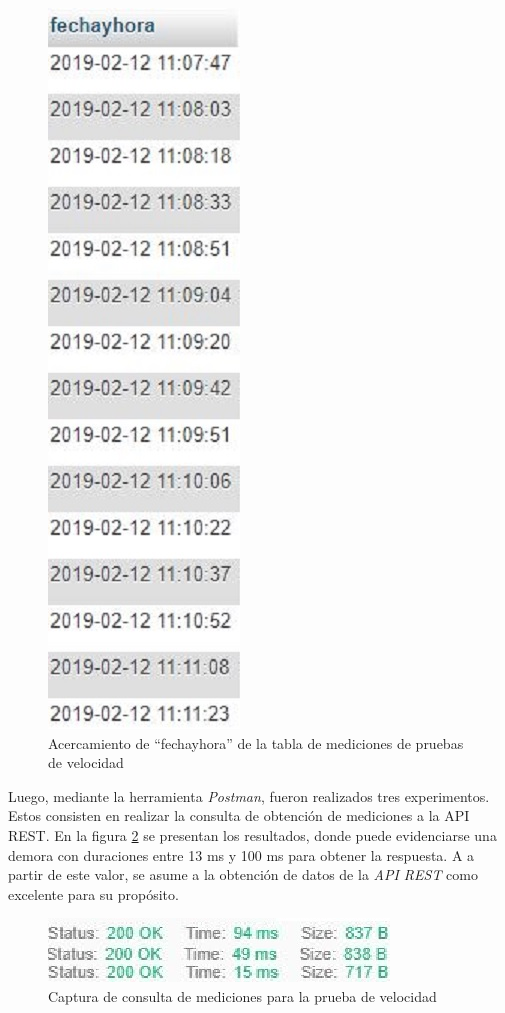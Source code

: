 \begin{figure}[H]
    \centering
    \includegraphics[scale=0.5]{Pruebas/InsercionesZOOM.jpg}
    \caption{Acercamiento de ``fechayhora'' de la tabla de mediciones de pruebas de velocidad}
    \label{fig:pruebasdeInsercionFechayHora}
\end{figure}
\par
Luego, mediante la herramienta \textit{Postman}, fueron realizados tres experimentos. Estos consisten en realizar la consulta de obtención de mediciones a la API REST. En la figura \ref{fig:pruebasdeConsulta} se presentan los resultados, donde puede evidenciarse una demora con duraciones entre 13 ms y 100 ms para obtener la respuesta. A a partir de este valor, se asume a la obtención de datos de la \textit{API REST} como excelente para su propósito.
\begin{figure}[h]
    \centering
    \includegraphics[scale=1]{Pruebas/postman3en1b.jpg}
    \caption{Captura de consulta de mediciones para la prueba de velocidad}
    \label{fig:pruebasdeConsulta}
\end{figure}

